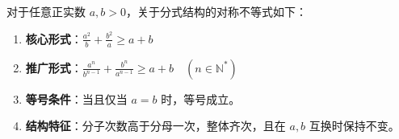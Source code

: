 \begin{statementbox}
对于任意正实数 $a, b > 0$，关于分式结构的对称不等式如下：
\begin{enumerate}
    \item \textbf{核心形式}：$\frac{a^2}{b} + \frac{b^2}{a} \geqslant a+b$
    \item \textbf{推广形式}：$\frac{a^n}{b^{n-1}} + \frac{b^n}{a^{n-1}} \geqslant a+b \quad (n \in \mathbb{N}^*)$
    \item \textbf{等号条件}：当且仅当 $a = b$ 时，等号成立。
    \item \textbf{结构特征}：分子次数高于分母一次，整体齐次，且在 $a, b$ 互换时保持不变。
\end{enumerate}
\end{statementbox}